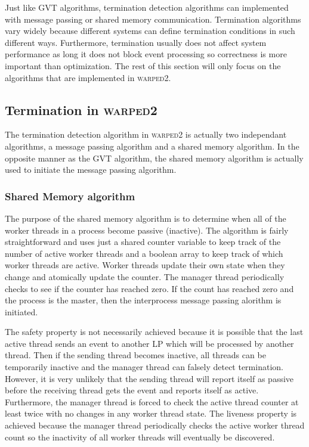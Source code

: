 \documentclass[11pt]{book}
\begin{document}
Just like GVT algorithms, termination detection algorithms can implemented with message
passing or shared memory communication. Termination algorithms vary widely because different
systems can define termination conditions in such different ways. Furthermore, termination
usually does not affect system performance as long it does not block event processing so
correctness is more important than optimization. The rest of this section will only focus
on the algorithms that are implemented in \textsc{warped2}.

\subsection{Termination in \textsc{warped2}}

The termination detection algorithm in \textsc{warped2} is actually two independant algorithms,
a message passing algorithm and a shared memory algorithm. In the opposite manner as the
GVT algorithm, the shared memory algorithm is actually used to initiate the message passing
algorithm.

\subsubsection{Shared Memory algorithm}

The purpose of the shared memory algorithm is to determine when all of the worker threads
in a process become passive (inactive). The algorithm is fairly straightforward and uses
just a shared counter variable to keep track of the number of active worker threads and a
boolean array to keep track of which worker threads are active. Worker threads update their own
state when they change and atomically update the counter. The manager thread periodically
checks to see if the counter has reached zero. If the count has reached zero and the process
is the master, then the interprocess message passing alorithm is initiated.

The safety property is not necessarily achieved because it is possible that the last active
thread sends an event to another LP which will be processed by another thread. Then if the sending
thread becomes inactive, all threads can be temporarily inactive and the manager thread can
falsely detect termination. However, it is very unlikely that the sending thread will report
itself as passive before the receiving thread gets the event and reports itself as active.
Furthermore, the manager thread is forced to check the active thread counter at least twice with
no changes in any worker thread state. The liveness property is achieved because the manager
thread periodically checks the active worker thread count so the inactivity of all worker threads
will eventually be discovered.
\end{document}
